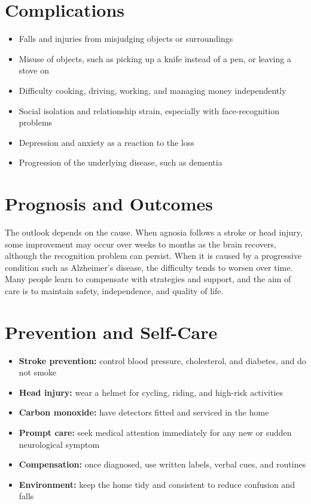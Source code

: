 \section*{Complications}
\begin{itemize}
    \item Falls and injuries from misjudging objects or surroundings
    \item Misuse of objects, such as picking up a knife instead of a pen, or leaving a stove on
    \item Difficulty cooking, driving, working, and managing money independently
    \item Social isolation and relationship strain, especially with face-recognition problems
    \item Depression and anxiety as a reaction to the loss
    \item Progression of the underlying disease, such as dementia
\end{itemize}

\section*{Prognosis and Outcomes}
The outlook depends on the cause. When agnosia follows a stroke or head injury, some improvement may occur over weeks to months as the brain recovers, although the recognition problem can persist. When it is caused by a progressive condition such as Alzheimer's disease, the difficulty tends to worsen over time. Many people learn to compensate with strategies and support, and the aim of care is to maintain safety, independence, and quality of life.

\section*{Prevention and Self-Care}
\begin{itemize}
    \item \textbf{Stroke prevention:} control blood pressure, cholesterol, and diabetes, and do not smoke
    \item \textbf{Head injury:} wear a helmet for cycling, riding, and high-risk activities
    \item \textbf{Carbon monoxide:} have detectors fitted and serviced in the home
    \item \textbf{Prompt care:} seek medical attention immediately for any new or sudden neurological symptom
    \item \textbf{Compensation:} once diagnosed, use written labels, verbal cues, and routines
    \item \textbf{Environment:} keep the home tidy and consistent to reduce confusion and falls
\end{itemize}

